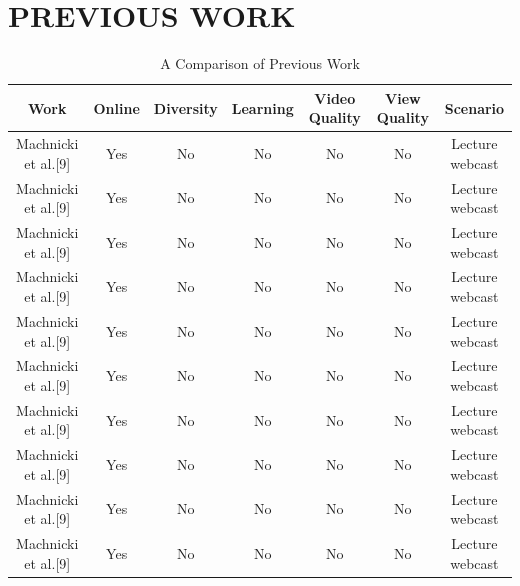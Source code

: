\documentclass{sig-alternate}
\begin{document}
\section {PREVIOUS WORK}
\begin{table}
\begin{center}

 \caption{A Comparison of Previous Work}
 \begin{tabular}{ c | c | c | c | c | c | c} 
 \hline
 Work & Online & Diversity & Learning & Video Quality & View Quality & Scenario\\  
 \hline
 Machnicki et al.[9] & Yes & No & No & No & No & Lecture webcast \\ 
 \hline
 Machnicki et al.[9] & Yes & No & No & No & No & Lecture  webcast \\
 \hline
 Machnicki et al.[9] & Yes & No & No & No & No & Lecture  webcast \\

\hline
 Machnicki et al.[9] & Yes & No & No & No & No & Lecture  webcast \\

\hline
 Machnicki et al.[9] & Yes & No & No & No & No & Lecture  webcast \\

\hline
 Machnicki et al.[9] & Yes & No & No & No & No & Lecture webcast \\

\hline
 Machnicki et al.[9] & Yes & No & No & No & No & Lecture webcast \\

\hline
 Machnicki et al.[9] & Yes & No & No & No & No & Lecture webcast \\

\hline
 Machnicki et al.[9] & Yes & No & No & No & No & Lecture webcast \\

\hline
 Machnicki et al.[9] & Yes & No & No & No & No & Lecture webcast \\
\hline

\end{tabular}
\end{center}
\end{table}
\end{document}
